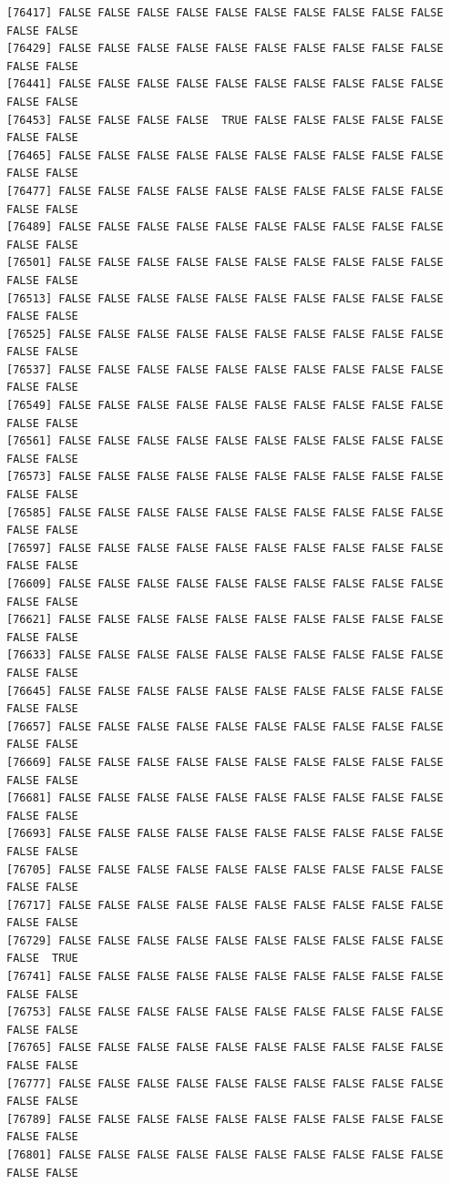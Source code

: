 \documentclass[
  a4paper,
  DIV=11,
  numbers=noendperiod]{scrartcl}
\begin{document}
\begin{verbatim}
[76417] FALSE FALSE FALSE FALSE FALSE FALSE FALSE FALSE FALSE FALSE FALSE FALSE
[76429] FALSE FALSE FALSE FALSE FALSE FALSE FALSE FALSE FALSE FALSE FALSE FALSE
[76441] FALSE FALSE FALSE FALSE FALSE FALSE FALSE FALSE FALSE FALSE FALSE FALSE
[76453] FALSE FALSE FALSE FALSE  TRUE FALSE FALSE FALSE FALSE FALSE FALSE FALSE
[76465] FALSE FALSE FALSE FALSE FALSE FALSE FALSE FALSE FALSE FALSE FALSE FALSE
[76477] FALSE FALSE FALSE FALSE FALSE FALSE FALSE FALSE FALSE FALSE FALSE FALSE
[76489] FALSE FALSE FALSE FALSE FALSE FALSE FALSE FALSE FALSE FALSE FALSE FALSE
[76501] FALSE FALSE FALSE FALSE FALSE FALSE FALSE FALSE FALSE FALSE FALSE FALSE
[76513] FALSE FALSE FALSE FALSE FALSE FALSE FALSE FALSE FALSE FALSE FALSE FALSE
[76525] FALSE FALSE FALSE FALSE FALSE FALSE FALSE FALSE FALSE FALSE FALSE FALSE
[76537] FALSE FALSE FALSE FALSE FALSE FALSE FALSE FALSE FALSE FALSE FALSE FALSE
[76549] FALSE FALSE FALSE FALSE FALSE FALSE FALSE FALSE FALSE FALSE FALSE FALSE
[76561] FALSE FALSE FALSE FALSE FALSE FALSE FALSE FALSE FALSE FALSE FALSE FALSE
[76573] FALSE FALSE FALSE FALSE FALSE FALSE FALSE FALSE FALSE FALSE FALSE FALSE
[76585] FALSE FALSE FALSE FALSE FALSE FALSE FALSE FALSE FALSE FALSE FALSE FALSE
[76597] FALSE FALSE FALSE FALSE FALSE FALSE FALSE FALSE FALSE FALSE FALSE FALSE
[76609] FALSE FALSE FALSE FALSE FALSE FALSE FALSE FALSE FALSE FALSE FALSE FALSE
[76621] FALSE FALSE FALSE FALSE FALSE FALSE FALSE FALSE FALSE FALSE FALSE FALSE
[76633] FALSE FALSE FALSE FALSE FALSE FALSE FALSE FALSE FALSE FALSE FALSE FALSE
[76645] FALSE FALSE FALSE FALSE FALSE FALSE FALSE FALSE FALSE FALSE FALSE FALSE
[76657] FALSE FALSE FALSE FALSE FALSE FALSE FALSE FALSE FALSE FALSE FALSE FALSE
[76669] FALSE FALSE FALSE FALSE FALSE FALSE FALSE FALSE FALSE FALSE FALSE FALSE
[76681] FALSE FALSE FALSE FALSE FALSE FALSE FALSE FALSE FALSE FALSE FALSE FALSE
[76693] FALSE FALSE FALSE FALSE FALSE FALSE FALSE FALSE FALSE FALSE FALSE FALSE
[76705] FALSE FALSE FALSE FALSE FALSE FALSE FALSE FALSE FALSE FALSE FALSE FALSE
[76717] FALSE FALSE FALSE FALSE FALSE FALSE FALSE FALSE FALSE FALSE FALSE FALSE
[76729] FALSE FALSE FALSE FALSE FALSE FALSE FALSE FALSE FALSE FALSE FALSE  TRUE
[76741] FALSE FALSE FALSE FALSE FALSE FALSE FALSE FALSE FALSE FALSE FALSE FALSE
[76753] FALSE FALSE FALSE FALSE FALSE FALSE FALSE FALSE FALSE FALSE FALSE FALSE
[76765] FALSE FALSE FALSE FALSE FALSE FALSE FALSE FALSE FALSE FALSE FALSE FALSE
[76777] FALSE FALSE FALSE FALSE FALSE FALSE FALSE FALSE FALSE FALSE FALSE FALSE
[76789] FALSE FALSE FALSE FALSE FALSE FALSE FALSE FALSE FALSE FALSE FALSE FALSE
[76801] FALSE FALSE FALSE FALSE FALSE FALSE FALSE FALSE FALSE FALSE FALSE FALSE

\end{verbatim}
\end{document}
